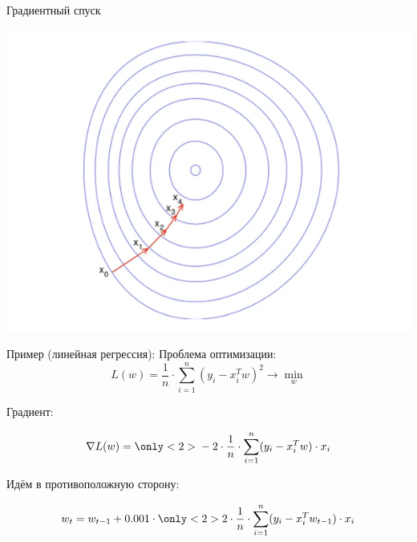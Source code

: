 \documentclass[notes,12pt, aspectratio=169]{beamer}
\begin{document}
\begin{frame}{Градиентный спуск}
\begin{center}
	\includegraphics[width=.6\linewidth]{2dgrad.png}
\end{center}

%	
%	
\end{frame}


\begin{frame}[fragile]{Пример (линейная регрессия):}
Проблема оптимизации: 
\[   
L(w) = \frac{1}{n} \cdot \sum_{i=1}^n  (y_i - x_i^T w)^2 \to \min_{w}
\]

Градиент: 

\[   
\nabla L(w) =   { \only<2>{ \color{red}} -2 \cdot   \frac{1}{n} \cdot \sum_{i=1}^n (y_i - x_i^T w)\cdot x_i }
\]

Идём в противоположную сторону: 

\[
w_t =   w_{t-1}  +  0.001 \cdot  { \only<2>{ \color{red}}  2 \cdot \frac{1}{n} \cdot \sum_{i=1}^n (y_i - x_i^T w_{t-1})\cdot x_i } 
\]

\end{frame}
\end{document}
